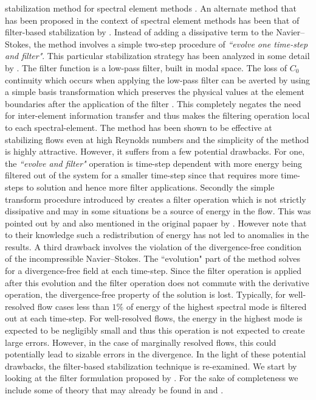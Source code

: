 stabilization method for spectral element methods \citep{kirby06}. An alternate method that has been proposed in the context of spectral element methods has been that of filter-based stabilization by \cite{fischer01}. Instead of adding a dissipative term to the Navier--Stokes, the method involves a simple two-step procedure of \textit{``evolve one time-step and filter"}. This particular stabilization strategy has been analyzed in some detail by \cite{ervin12}. The filter function is a low-pass filter, built in modal space. The loss of $C_{0}$ continuity which occurs when applying the low-pass filter can be averted by using a simple basis transformation which preserves the physical values at the element boundaries after the application of the filter \citep{boyd98}. This completely negates the need for inter-element information transfer and thus makes the filtering operation local to each spectral-element. The method has been shown to be effective at stabilizing flows even at high Reynolds numbers and the simplicity of the method is highly attractive. However, it suffers from a few potential drawbacks. For one, the \textit{``evolve and filter"} operation is time-step dependent with more energy being filtered out of the system for a smaller time-step since that requires more time-steps to solution and hence more filter applications. Secondly the simple transform procedure introduced by \cite{boyd98} creates a filter operation which is not strictly dissipative and may in some situations be a source of energy in the flow. This was pointed out by \cite{pasquetti02} and also mentioned in the original papaer by \cite{fischer01}. However \cite{pasquetti02} note that to their knowledge such a redistribution of energy has not led to anomalies in the results. A third drawback involves the violation of the divergence-free condition of the incompressible Navier--Stokes. The ``evolution" part of the method solves for a divergence-free field at each time-step. Since the filter operation is applied after this evolution and the filter operation does not commute with the derivative operation, the divergence-free property of the solution is lost. Typically, for well-resolved flow cases less than $1\%$ of energy of the highest spectral mode is filtered out at each time-step. For well-resolved flows, the energy in the highest mode is expected to be negligibly small and thus this operation is not expected to create large errors. However, in the case of marginally resolved flows, this could potentially lead to sizable errors in the divergence. In the light of these potential drawbacks, the filter-based stabilization technique is re-examined. We start by looking at the filter formulation proposed by \cite{boyd98}. For the sake of completeness we include some of theory that may already be found in \cite{boyd98,fischer01} and \cite{pasquetti02}.

